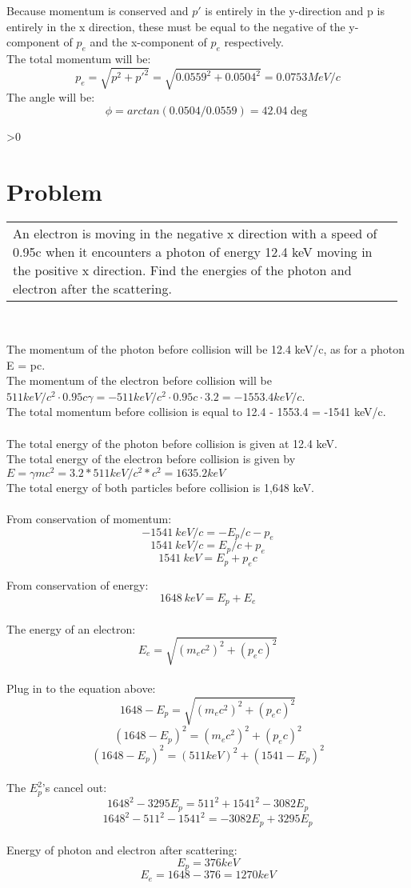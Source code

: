\documentclass{article}
\newcounter{problemnumber}\setcounter{problemnumber}{1}
\newcommand{\problem}[1][-1]{
    \setcounter{partnumber}{1}
    \ifnum#1>0
        \setcounter{problemnumber}{#1}
    \fi
    \section*{Problem \arabic{problemnumber}}
    \stepcounter{problemnumber}
}
\newcounter{partnumber}\setcounter{partnumber}{1}
\newenvironment{question}{
    \color{gray}\itshape
    \vspace{5pt}
    \begin{tabular}{|p{0.97\linewidth}}
}{
    \end{tabular}\\[5pt]
}
\begin{document}
Because momentum is conserved and $p'$ is entirely in the y-direction and p is entirely in the x direction, these must be equal to the negative of the y-component of $p_e$ and the x-component of $p_e$ respectively.\\
The total momentum will be:
$$ p_e = \sqrt{p^2 + p'^2} = \sqrt{0.0559^2 + 0.0504^2} = 0.0753 MeV/c $$
The angle will be:
$$ \phi = arctan(0.0504/0.0559) = 42.04 \deg $$

\newpage
\problem
\begin{question}
An electron is moving in the negative x direction with a speed of 0.95c when it encounters a photon of energy 12.4 keV moving in the positive x direction. Find the energies of the photon and electron after the scattering. 
\end{question}

The momentum of the photon before collision will be 12.4 keV/c, as for a photon E = pc. \\
The momentum of the electron before collision will be $511 keV/c^2 \cdot 0.95c \gamma = - 511 keV/c^2 \cdot 0.95c \cdot 3.2  = -1553.4 keV/c$. \\
The total momentum before collision is equal to 12.4 - 1553.4 = -1541 keV/c. \\
\\

The total energy of the photon before collision is given at 12.4 keV.\\
The total energy of the electron before collision is given by $E = \gamma mc^2 = 3.2 * 511 keV/c^2 * c^2 = 1635.2 keV $ \\
The total energy of both particles before collision is 1,648 keV.\\
\\

From conservation of momentum:
$$ -1541\ keV/c = -E_p/c - p_e $$
$$ 1541\ keV/c = E_p/c + p_e $$
$$ 1541\ keV = E_p + p_e c $$

From conservation of energy:
$$ 1648\ keV = E_p + E_e $$ \\

The energy of an electron:
$$ E_e = \sqrt{(m_ec^2)^2 + (p_ec)^2} $$ \\

Plug in to the equation above:
$$ 1648 - E_p = \sqrt{(m_ec^2)^2 + (p_ec)^2} $$
$$ (1648 - E_p)^2 = (m_ec^2)^2 + (p_ec)^2 $$ 
$$ (1648 - E_p)^2 = (511 keV)^2 + (1541 - E_p)^2 $$\\
The $E_p^2$'s cancel out:
$$ 1648^2 - 3295 E_p = 511^2 + 1541^2 - 3082 E_p $$
$$ 1648^2 - 511^2 - 1541^2 = - 3082 E_p + 3295 E_p $$\\

Energy of photon and electron after scattering:
$$ E_p = 376 keV $$
$$ E_e = 1648 - 376 = 1270 keV $$
\end{document}

